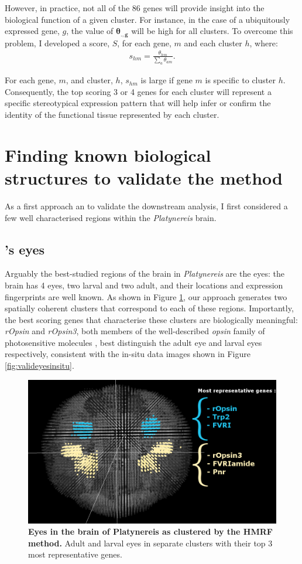 	However, in practice, not all of the 86 genes will provide insight into the biological function of a given cluster. For instance, in the case of a ubiquitously expressed gene, $g$, the value of $\mathbf{\theta_{.,g}}$ will be high for all clusters. To overcome this problem, I developed a score, $S$, for each gene, $m$ and each cluster $h$, where:
\begin{align*}
s_{hm} = \frac{\theta_{hm}}{\sum_{a} \theta_{am}}.
\end{align*}

For each gene, $m$, and cluster, $h$, $s_{hm}$ is large if gene $m$ is specific to cluster $h$. Consequently, the top scoring 3 or 4 genes for each cluster will represent a specific stereotypical expression pattern that will help infer or confirm the identity of the functional tissue represented by each cluster.

	\section{Finding known biological structures to validate the method}
	As a first approach an to validate the downstream analysis, I first considered a few well characterised regions within the {\it{Platynereis}} brain.
		\subsection{\platy{}'s eyes}
		Arguably the best-studied regions of the brain in {\it{Platynereis}} are the eyes: the brain has 4 eyes, two larval and two adult, and their locations and expression fingerprints are well known. As shown in Figure \ref{fig:valideyesclust}, our approach generates two spatially coherent clusters that correspond to each of these regions. Importantly, the best scoring genes that characterise these clusters are biologically meaningful: {\it{rOpsin}} and {\it{rOpsin3}}, both members of the well-described \emph{opsin} family of photosensitive molecules \cite{terakita05,randel13}, best distinguish the adult eye and larval eyes respectively, consistent with the in-situ data images shown in Figure \ref{fig:valideyesinsitu}.
	\begin{figure}[h]
\centerline{\includegraphics[width=0.8\linewidth]{gfx/chapter6/eyes.png}}
\caption{{\bf Eyes in the brain of Platynereis as clustered by the HMRF method.} Adult and larval eyes in separate clusters with their top 3 most representative genes.}
\label{fig:valideyesclust}
	\end{figure}
	
